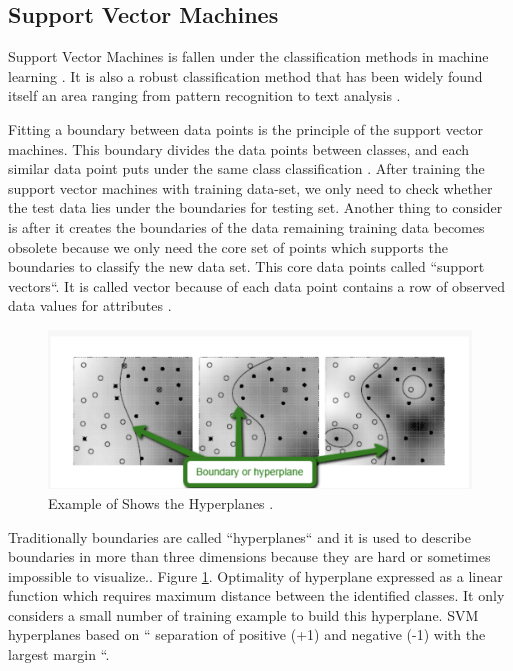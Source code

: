 \documentclass[sigconf]{acmart}
\begin{document}
\subsection{Support Vector Machines}
Support Vector Machines is fallen under the classification methods in machine learning \cite{www-simafore-svm}. It is also a robust classification method that has been widely found itself an area ranging from pattern recognition to text analysis \cite{www-simafore-svm}. 
\par Fitting a boundary between data points is the principle of the support vector machines. This boundary divides the data points between classes, and each similar data point puts under the same class classification \cite{www-simafore-svm}. After training the support vector machines with training data-set, we only need to check whether the test data lies under the boundaries for testing set. Another thing to consider is after it creates the boundaries of the data remaining training data becomes obsolete because we only need the core set of points which supports the boundaries to classify the new data set. This core data points called ``support vectors``. It is called vector because of each data point contains a row of observed data values for attributes \cite{www-simafore-svm}. 

 \begin{figure}[!ht]
  \centering
      \includegraphics[width=\columnwidth]{images/hyperplane-boundary.png}
  \caption{Example of Shows the Hyperplanes \cite{www-simafore-svm}.}\label{fig:Hyperplane}
\end{figure}

\par Traditionally boundaries are called ``hyperplanes`` and it is used to describe boundaries in more than three dimensions because they are hard or sometimes impossible to visualize.\cite{www-simafore}. Figure \ref{fig:Hyperplane}. Optimality of hyperplane expressed as a linear function which requires maximum distance between the identified classes. It only considers a small number of training example to build this hyperplane. SVM hyperplanes based on `` separation of positive (+1) and negative (-1) with the largest margin \cite{verma-ssv}``.
\end{document}
